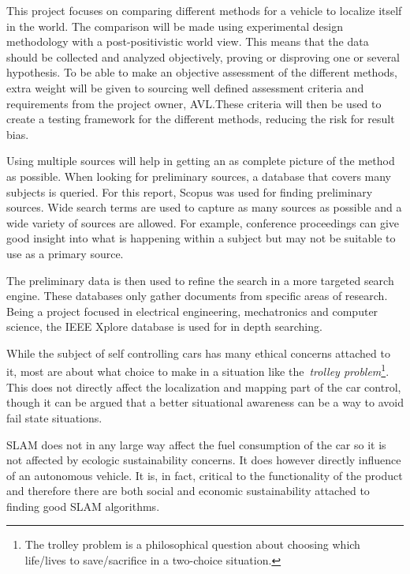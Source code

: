 This project focuses on comparing different methods for a vehicle to localize
itself in the world. The comparison will be made using experimental design
methodology with a post-positivistic world view. This means that the data should
be collected and analyzed objectively, proving or disproving one or several
hypothesis. To be able to make an objective assessment of the different methods,
extra weight will be given to sourcing well defined assessment criteria and
requirements from the project owner, AVL.\@ These criteria will then be used to
create a testing framework for the different methods, reducing the risk for
result bias.

Using multiple sources will help in getting an as complete picture of the method
as possible. When looking for preliminary sources, a database that covers many
subjects is queried. For this report, Scopus was used for finding preliminary
sources. Wide search terms are used to capture as many sources as possible and a
wide variety of sources are allowed. For example, conference proceedings can
give good insight into what is happening within a subject but may not be
suitable to use as a primary source. 

The preliminary data is then used to refine the search in a more targeted search
engine. These databases only gather documents from specific areas of research.
Being a project focused in electrical engineering, mechatronics and computer
science, the IEEE Xplore database is used for in depth searching.  

While the subject of self controlling cars has many ethical concerns attached to
it, most are about what choice to make in a situation like the~\textit{trolley
problem}\footnote{The
trolley problem is a philosophical question about choosing which life/lives to
save/sacrifice in a two-choice situation.}. This does not directly
affect the localization and mapping part of the car control, though it can be
argued that a better situational awareness can be a way to avoid fail state
situations. 

SLAM does not in any large way affect the fuel consumption of the car so it is
not affected by ecologic sustainability concerns. It does however directly
influence of an autonomous vehicle. It is, in fact, critical to the
functionality of the product and therefore there are both social and economic
sustainability attached to finding good SLAM algorithms. 
